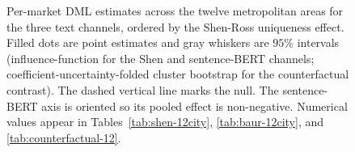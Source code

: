 \begin{figure}[!htbp]
\caption{Per-market DML estimates across the twelve metropolitan areas for the
three text channels, ordered by the Shen-Ross uniqueness effect. Filled dots are
point estimates and gray whiskers are $95\%$ intervals (influence-function for
the Shen and sentence-BERT channels; coefficient-uncertainty-folded cluster
bootstrap for the counterfactual contrast). The dashed vertical line marks the
null. The sentence-BERT axis is oriented so its pooled effect is non-negative.
Numerical values appear in Tables~\ref{tab:shen-12city}, \ref{tab:baur-12city},
and \ref{tab:counterfactual-12}.}
\label{fig:forest-12}
\end{figure}


